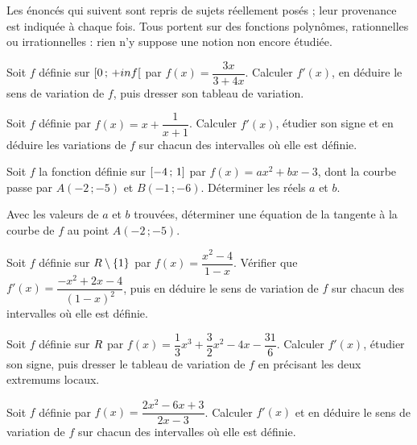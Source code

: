 \begin{annales}
Les énoncés qui suivent sont repris de sujets réellement posés ; leur
provenance est indiquée à chaque fois. Tous portent sur des fonctions
polynômes, rationnelles ou irrationnelles : rien n'y suppose une notion non
encore étudiée.

Soit $f$ définie sur $\left[0\,;\,+inf\right[$ par
$f(x) = \dfrac{3x}{3+4x}$. Calculer $f'(x)$, en déduire le sens de variation
de $f$, puis dresser son tableau de variation.

Soit $f$ définie par $f(x) = x+\dfrac{1}{x+1}$. Calculer $f'(x)$, étudier son
signe et en déduire les variations de $f$ sur chacun des intervalles où elle
est définie.

Soit $f$ la fonction définie sur $\left[-4\,;\,1\right]$ par
$f(x) = ax^{2}+bx-3$, dont la courbe passe par $A(-2\,;-5)$ et
$B(-1\,;-6)$. Déterminer les réels $a$ et $b$.

Avec les valeurs de $a$ et $b$ trouvées, déterminer une équation de la
tangente à la courbe de $f$ au point $A(-2\,;-5)$.

Soit $f$ définie sur $R\setminus\{1\}$ par $f(x) = \dfrac{x^{2}-4}{1-x}$.
Vérifier que $f'(x) = \dfrac{-x^{2}+2x-4}{(1-x)^{2}}$, puis en déduire le sens
de variation de $f$ sur chacun des intervalles où elle est définie.

Soit $f$ définie sur $R$ par
$f(x) = \dfrac{1}{3}x^{3}+\dfrac{3}{2}x^{2}-4x-\dfrac{31}{6}$. Calculer
$f'(x)$, étudier son signe, puis dresser le tableau de variation de $f$ en
précisant les deux extremums locaux.

Soit $f$ définie par $f(x) = \dfrac{2x^{2}-6x+3}{2x-3}$. Calculer $f'(x)$ et
en déduire le sens de variation de $f$ sur chacun des intervalles où elle est
définie.


\end{annales}
